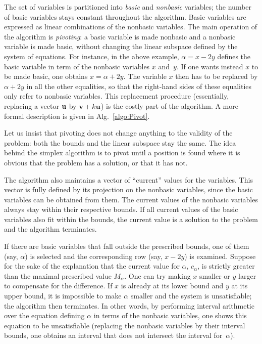 The set of variables is partitioned into \emph{basic} and \emph{nonbasic} variables; the number of basic variables stays constant throughout the algorithm. Basic variables are expressed as linear combinations of the nonbasic variables. The main operation of the algorithm is \emph{pivoting}: a basic variable is made nonbasic and a nonbasic variable is made basic, without changing the linear subspace defined by the system of equations. For instance, in the above example, $\alpha = x - 2y$ defines the basic variable in term of the nonbasic variables $x$ and~$y$. If one wants instead $x$ to be made basic, one obtains $x = \alpha + 2y$. The variable $x$ then has to be replaced by $\alpha + 2y$ in all the other equalities, so that the right-hand sides of these equalities only refer to nonbasic variables. This replacement procedure (essentially, replacing a vector $\mathbf{u}$ by $\mathbf{v}+k\mathbf{u}$) is the costly part of the algorithm. A more formal description is given in Alg.~\ref{algo:Pivot}.

Let us insist that pivoting does not change anything to the validity of the problem: both the bounds and the linear subspace stay the same. The idea behind the simplex algorithm is to pivot until a position is found where it is obvious that the problem has a solution, or that it has not.

The algorithm also maintains a vector of ``current'' values for the variables. This vector is fully defined by its projection on the nonbasic variables, since the basic variables can be obtained from them. The current values of the nonbasic variables always stay within their respective bounds. If all current values of the basic variables also fit within the bounds, the current value is a solution to the problem and the algorithm terminates.

If there are basic variables that fall outside the prescribed bounds, one of them (say, $\alpha$) is selected and the corresponding row (say, $x-2y$) is examined. Suppose for the sake of the explanation that the current value for $\alpha$, $c_\alpha$, is strictly greater than the maximal prescribed value $M_\alpha$. One can try making $x$ smaller or $y$ larger to compensate for the difference. If $x$ is already at its lower bound and $y$ at its upper bound, it is impossible to make $\alpha$ smaller and the system is unsatisfiable; the algorithm then terminates. In other words, by performing interval arithmetic over the equation defining $\alpha$ in terms of the nonbasic variables, one shows this equation to be unsatisfiable (replacing the nonbasic variables by their interval bounds, one obtains an interval that does not intersect the interval for~$\alpha$).

